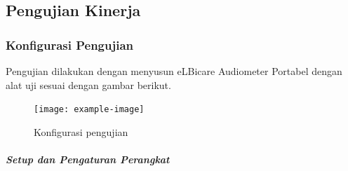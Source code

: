\documentclass{article}
\begin{document}
	\subsection{Pengujian Kinerja}
	
	\subsubsection{Konfigurasi Pengujian}
	Pengujian dilakukan dengan menyusun eLBicare Audiometer Portabel dengan alat uji sesuai dengan gambar berikut.
	
	\begin{figure}[H]
		\centering
		\texttt{[image: example-image]}
		\caption{Konfigurasi pengujian}
	\end{figure}
	
	\subparagraph{Setup dan Pengaturan Perangkat}
\end{document}
